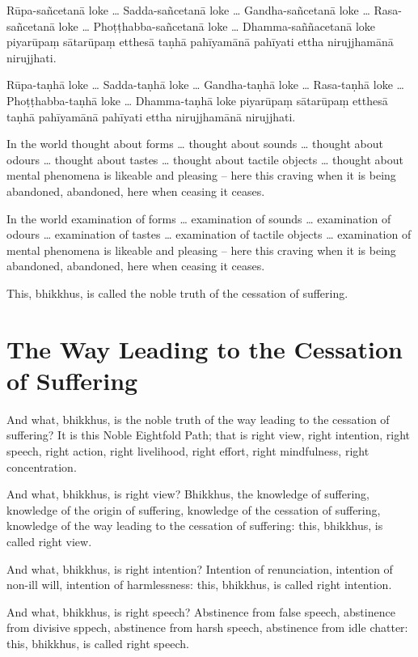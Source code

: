 Rūpa-sañcetanā loke \ldots{} Sadda-sañcetanā loke \ldots{} Gandha-sañcetanā loke
\ldots{} Rasa-sañcetanā loke \ldots{} Phoṭṭhabba-sañcetanā loke \ldots{}
Dhamma-saññacetanā loke piyarūpaṃ sātarūpaṃ etthesā taṇhā pahīyamānā pahīyati
ettha nirujjhamānā nirujjhati.

Rūpa-taṇhā loke \ldots{} Sadda-taṇhā loke \ldots{} Gandha-taṇhā loke \ldots{}
Rasa-taṇhā loke \ldots{} Phoṭṭhabba-taṇhā loke \ldots{} Dhamma-taṇhā loke piyarūpaṃ
sātarūpaṃ etthesā taṇhā pahīyamānā pahīyati ettha nirujjhamānā nirujjhati.

\englishPage

In the world thought about forms \ldots{} thought about sounds \ldots{} thought
about odours \ldots{} thought about tastes \ldots{} thought about tactile
objects \ldots{} thought about mental phenomena is likeable and pleasing -- here
this craving when it is being abandoned, abandoned, here when ceasing it ceases.

In the world examination of forms \ldots{} examination of sounds \ldots{}
examination of odours \ldots{} examination of tastes \ldots{} examination of
tactile objects \ldots{} examination of mental phenomena is likeable and
pleasing -- here this craving when it is being abandoned, abandoned, here when
ceasing it ceases.

This, bhikkhus, is called the noble truth of the cessation of suffering.

\section{The Way Leading to the Cessation of Suffering}

And what, bhikkhus, is the noble truth of the way leading to the cessation of
suffering? It is this Noble Eightfold Path; that is right view, right intention,
right speech, right action, right livelihood, right effort, right mindfulness,
right concentration.

And what, bhikkhus, is right view? Bhikkhus, the knowledge of suffering,
knowledge of the origin of suffering, knowledge of the cessation of suffering,
knowledge of the way leading to the cessation of suffering: this, bhikkhus, is
called right view.

And what, bhikkhus, is right intention? Intention of renunciation, intention of
non-ill will, intention of harmlessness: this, bhikkhus, is called right
intention.

And what, bhikkhus, is right speech? Abstinence from false speech, abstinence
from divisive sppech, abstinence from harsh speech, abstinence from idle
chatter: this, bhikkhus, is called right speech.

